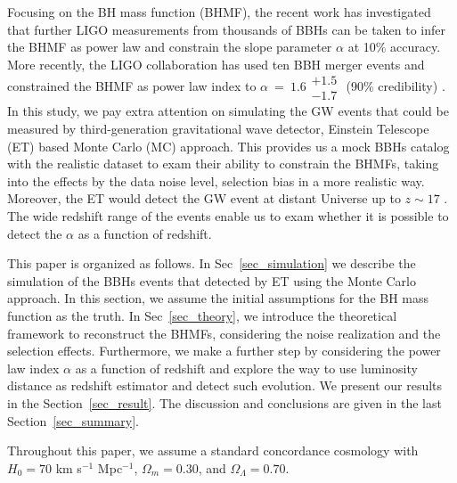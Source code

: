 \documentclass[twocolumn]{aastex62}
\begin{document}
Focusing on the BH mass function (BHMF), the recent work \citet{Kovetz2017PhRvD} has investigated that further LIGO measurements from thousands of BBHs can be taken to infer the  BHMF as power law and constrain the slope parameter $\alpha$ at 10\% accuracy. More recently, the LIGO collaboration has used ten BBH merger events and constrained the BHMF as power law index to $\alpha~=~1.6\substack{+1.5\\-1.7}$ (90\% credibility) \citep{Abbott2018b}. In this study, we pay extra attention on simulating the GW events that could be measured by third-generation gravitational wave detector, Einstein Telescope (ET) \citep{Abernathy2011} based Monte Carlo (MC) approach. This provides us a mock BBHs catalog with the realistic dataset to exam their ability to constrain the BHMFs, taking into the effects by the data noise level, selection bias in a more realistic way. Moreover, the ET would detect the GW event at distant Universe up to $z\sim17$ \citep{Abernathy2011}. The wide redshift range of the events enable us to exam whether it is possible to detect the $\alpha$ as a function of redshift.

This paper is organized as follows. In Sec~\ref{sec_simulation} we describe the simulation of the BBHs events that detected by ET using the Monte Carlo approach. In this section, we assume the initial assumptions for the BH mass function as the truth. In Sec~\ref{sec_theory}, we introduce the theoretical framework to reconstruct the BHMFs, considering the noise realization and the selection effects. Furthermore, we make a further step by considering the power law index $\alpha$ as a function of redshift and explore the way to use luminosity distance as redshift estimator and detect such evolution. We present our results in the Section~\ref{sec_result}. The discussion and conclusions are given in the last Section~\ref{sec_summary}.

Throughout this paper, we assume a standard concordance cosmology with $H_0= 70$ km s$^{-1}$ Mpc$^{-1}$, $\Omega{_m} = 0.30$, and $\Omega{_\Lambda} = 0.70$.

\vspace{1cm}
\end{document}

